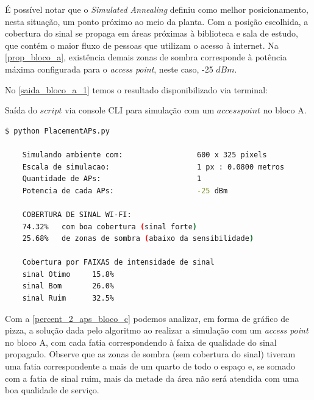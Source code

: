\documentclass[
	12pt,				%
	twoside,			%
	a4paper,			%
	english,			%
	french,				%
	spanish,			%
	brazil				%
	]{abntex2}
\begin{document}
É possível notar que o \emph{Simulated Annealing} definiu como melhor
posicionamento, nesta situação, um ponto próximo ao meio da planta. Com
a posição escolhida, a cobertura do sinal se propaga em áreas próximas à
biblioteca e sala de estudo, que contém o maior fluxo de pessoas que
utilizam o acesso à internet. Na \autoref{prop_bloco_a}, existência
demais zonas de sombra corresponde à potência máxima configurada para o
\emph{access point}, neste caso, -25 \(dBm\).

\clearpage

No \autoref{saida_bloco_a_1} temos o resultado disponibilizado via
terminal:

\begin{quadro}[!htb]
    \caption{\label{saida_bloco_a_1} Saída do $script$ via console CLI para simulação com um $access point$ no bloco A. }

    \begin{lstlisting}[language=bash]
    $ python PlacementAPs.py 

    Simulando ambiente com:                 600 x 325 pixels
    Escala de simulacao:                    1 px : 0.0800 metros
    Quantidade de APs:                      1
    Potencia de cada APs:                   -25 dBm

    COBERTURA DE SINAL WI-FI:
    74.32%   com boa cobertura (sinal forte)
    25.68%   de zonas de sombra (abaixo da sensibilidade)

    Cobertura por FAIXAS de intensidade de sinal
    sinal Otimo     15.8%
    sinal Bom       26.0%
    sinal Ruim      32.5%
    \end{lstlisting}
\end{quadro}

Com a \autoref{percent_2_aps_bloco_c} podemos analizar, em forma de
gráfico de pizza, a solução dada pelo algoritmo ao realizar a simulação
com um \emph{access point} no bloco A, com cada fatia correspondendo à
faixa de qualidade do sinal propagado. Observe que as zonas de sombra
(sem cobertura do sinal) tiveram uma fatia correspondente a mais de um
quarto de todo o espaço e, se somado com a fatia de sinal ruim, mais da
metade da área não será atendida com uma boa qualidade de serviço.
\end{document}
